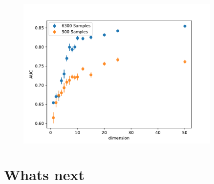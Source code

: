 \documentclass[hyperref={pdfpagelabels=false}]{beamer}
\begin{document}
\begin{frame}[label=]
\frametitle{}
\begin{figure}[H] 
  \centering
\includegraphics[width=0.9\textwidth]{../imgs/cdimensional}
\label{fig:cdimensional}
  \end{figure}


\end{frame}



\newpage
\section{Whats next}\label{sec:Whats next}
\end{document}
